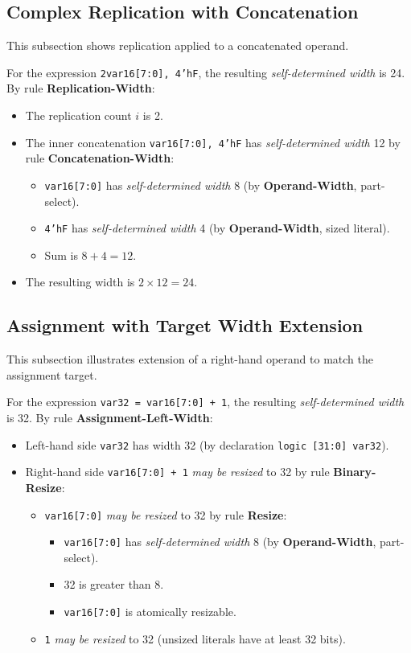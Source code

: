 \documentclass{article}
\newcommand{\sv}[1]{\texttt{#1}}
\newcommand{\sds}{\emph{self-determined width}}
\newcommand{\mbr}{\emph{may be resized}}
\begin{document}
\subsection{Complex Replication with Concatenation}

This subsection shows replication applied to a concatenated operand.

For the expression \sv{{2{var16[7:0], 4'hF}}}, the resulting
\sds{} is 24. By rule \textbf{Replication-Width}:
\begin{itemize}
  \item The replication count $i$ is 2.
  \item The inner concatenation \sv{{var16[7:0], 4'hF}} has
    \sds{} 12 by rule \textbf{Concatenation-Width}:
    \begin{itemize}
      \item \sv{var16[7:0]} has \sds{} 8 (by
        \textbf{Operand-Width}, part-select).
      \item \sv{4'hF} has \sds{} 4 (by
        \textbf{Operand-Width}, sized literal).
      \item Sum is $8 + 4 = 12$.
    \end{itemize}
  \item The resulting width is $2 \times 12 = 24$.
\end{itemize}

\subsection{Assignment with Target Width Extension}

This subsection illustrates extension of a right-hand operand to
match the assignment target.

For the expression \sv{var32 = var16[7:0] + 1}, the resulting
\sds{} is 32. By rule \textbf{Assignment-Left-Width}:
\begin{itemize}
  \item Left-hand side \sv{var32} has width 32
    (by declaration \sv{logic [31:0] var32}).
  \item Right-hand side \sv{var16[7:0] + 1} \mbr{} to 32
    by rule \textbf{Binary-Resize}:
    \begin{itemize}
      \item \sv{var16[7:0]} \mbr{} to 32 by rule \textbf{Resize}:
        \begin{itemize}
          \item \sv{var16[7:0]} has \sds{} 8 (by
            \textbf{Operand-Width}, part-select).
          \item 32 is greater than 8.
          \item \sv{var16[7:0]} is atomically resizable.
        \end{itemize}
      \item \sv{1} \mbr{} to 32 (unsized literals have
        at least 32 bits).
    \end{itemize}
\end{itemize}
\end{document}
